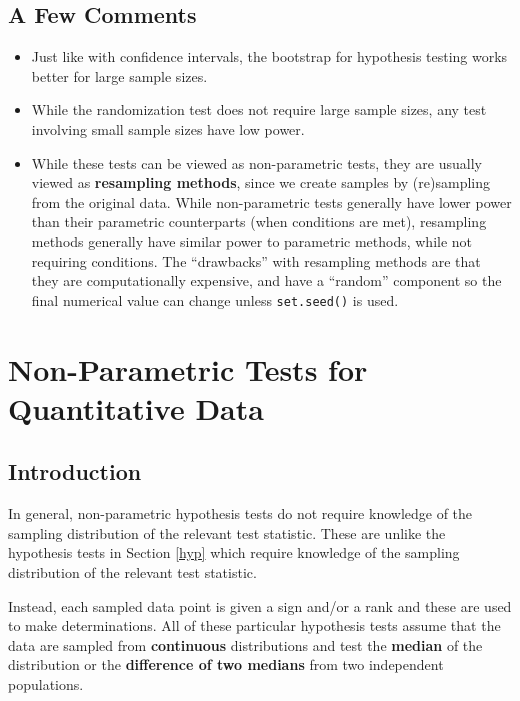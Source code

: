 \documentclass[
]{book}
\providecommand{\tightlist}{%
  \setlength{\itemsep}{0pt}\setlength{\parskip}{0pt}}
\theoremstyle{definition}
\theoremstyle{definition}
\theoremstyle{definition}
\theoremstyle{definition}
\theoremstyle{remark}
\begin{document}
\hypertarget{a-few-comments}{%
\section{A Few Comments}\label{a-few-comments}}

\begin{itemize}
\tightlist
\item
  Just like with confidence intervals, the bootstrap for hypothesis testing works better for large sample sizes.
\item
  While the randomization test does not require large sample sizes, any test involving small sample sizes have low power.
\item
  While these tests can be viewed as non-parametric tests, they are usually viewed as \textbf{resampling methods}, since we create samples by (re)sampling from the original data. While non-parametric tests generally have lower power than their parametric counterparts (when conditions are met), resampling methods generally have similar power to parametric methods, while not requiring conditions. The ``drawbacks'' with resampling methods are that they are computationally expensive, and have a ``random'' component so the final numerical value can change unless \texttt{set.seed()} is used.
\end{itemize}

\hypertarget{nonparamquant}{%
\chapter{Non-Parametric Tests for Quantitative Data}\label{nonparamquant}}

\hypertarget{introduction-7}{%
\section{Introduction}\label{introduction-7}}

In general, non-parametric hypothesis tests do not require knowledge of the sampling distribution of the relevant test statistic. These are unlike the hypothesis tests in Section \ref{hyp} which require knowledge of the sampling distribution of the relevant test statistic.

Instead, each sampled data point is given a sign and/or a rank and these are used to make determinations. All of these particular hypothesis tests assume that the data are sampled from \textbf{continuous} distributions and test the \textbf{median} of the distribution or the \textbf{difference of two medians} from two independent populations.
\end{document}
